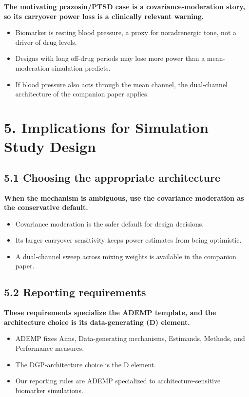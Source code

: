 \documentclass[
  11pt,
]{article}
\begin{document}
\textbf{The motivating prazosin/PTSD case is a covariance-moderation
story, so its carryover power loss is a clinically relevant
warning.}

\begin{itemize}\setlength{\itemsep}{2pt}\setlength{\parskip}{0pt}
\item Biomarker is resting blood pressure, a proxy for noradrenergic
tone, not a driver of drug levels.
\item Designs with long off-drug periods may lose more power than a
mean-moderation simulation predicts.
\item If blood pressure also acts through the mean channel, the
dual-channel architecture of the companion paper applies.
\end{itemize}

\section{5. Implications for Simulation Study Design}

\subsection{5.1 Choosing the appropriate architecture}

\textbf{When the mechanism is ambiguous, use the
covariance moderation as the conservative default.}

\begin{itemize}\setlength{\itemsep}{2pt}\setlength{\parskip}{0pt}
\item Covariance moderation is the safer default for design decisions.
\item Its larger carryover sensitivity keeps power estimates from
being optimistic.
\item A dual-channel sweep across mixing weights is available in
the companion paper.
\end{itemize}

\subsection{5.2 Reporting requirements}

\textbf{These requirements specialize the ADEMP template, and
the architecture choice is its data-generating (D) element.}

\begin{itemize}\setlength{\itemsep}{2pt}\setlength{\parskip}{0pt}
\item ADEMP fixes Aims, Data-generating mechanisms, Estimands,
Methods, and Performance measures.
\item The DGP-architecture choice is the D element.
\item Our reporting rules are ADEMP specialized to
architecture-sensitive biomarker simulations.
\end{itemize}
\end{document}
